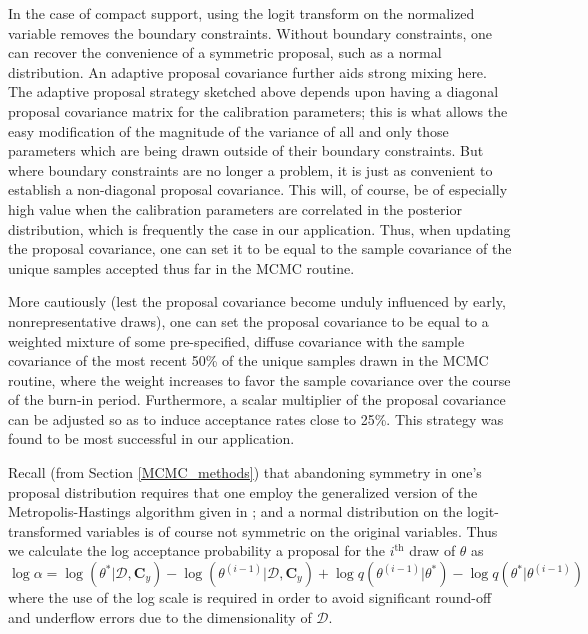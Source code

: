 \documentclass{article}
\begin{document}
In the case of compact support, using the logit transform on the normalized variable removes the boundary constraints. Without boundary constraints, one can recover the convenience of a symmetric proposal, such as a normal distribution. An adaptive proposal covariance further aids strong mixing here. The adaptive proposal strategy sketched above depends upon having a diagonal proposal covariance matrix for the calibration parameters; this is what allows the easy modification of the magnitude of the variance of all and only those parameters which are being drawn outside of their boundary constraints. But where boundary constraints are no longer a problem, it is just as convenient to establish a non-diagonal proposal covariance. This will, of course, be of especially high value when the calibration parameters are correlated in the posterior distribution, which is frequently the case in our application. Thus, when updating the proposal covariance, one can set it to be equal to the sample covariance of the unique samples accepted thus far in the MCMC routine. 

More cautiously (lest the proposal covariance become unduly influenced by early, nonrepresentative draws), one can set the proposal covariance to be equal to a weighted mixture of some pre-specified, diffuse covariance with the sample covariance of the most recent 50\% of the unique samples drawn in the MCMC routine, where the weight increases to favor the sample covariance over the course of the burn-in period. Furthermore, a scalar multiplier of the proposal covariance can be adjusted so as to induce acceptance rates close to 25\%. This strategy was found to be most successful in our application.

Recall (from Section \ref{MCMC_methods}) that abandoning symmetry in one's proposal distribution requires that one employ the generalized version of the Metropolis-Hastings algorithm given in \cite{Hastings1970}; and a normal distribution on the logit-transformed variables is of course not symmetric on the original variables. Thus we calculate the log acceptance probability a proposal for the $i^{\text{th}}$ draw of $\theta$ as 
\begin{equation}
\log \alpha = \log(\theta^*|\mathcal D, \mathbf C_y) - \log(\theta^{(i-1)}|\mathcal D,\mathbf C_y) + \log q(\theta^{(i-1)}|\theta^*)
- \log q(\theta^* |\theta^{(i-1)})
\end{equation}
where the use of the log scale is required in order to avoid significant round-off and underflow errors due to the dimensionality of $\mathcal D$.
\end{document}
